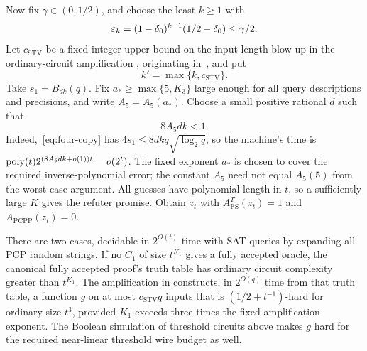 Now fix $\gamma\in(0,1/2)$, and choose the least $k\ge1$ with
\begin{equation}\label{eq:xor-k}
 \varepsilon_k=(1-\delta_0)^{k-1}(1/2-\delta_0)\le\gamma/2.
\end{equation}
Let $c_{\mathrm{STV}}$ be a fixed integer upper bound on the input-length blow-up in the
ordinary-circuit amplification \cite[Lemma 3.9]{CLW20}, originating
in~\cite{STV01}, and put
\begin{equation}\label{eq:kprime}
 k'=\max\{k,c_{\mathrm{STV}}\}.
\end{equation}
Take $s_1=B_{dk}(q)$. Fix
$a_*\ge\max\{5,K_3\}$ large enough for all query descriptions and
precisions, and write $A_5=A_5(a_*)$. Choose a small positive rational
$d$ such that
\begin{equation}\label{eq:avg-time-condition}
 8A_5dk<1.
\end{equation}
Indeed,~\eqref{eq:four-copy} has $4s_1\le8dkq\sqrt{\log_2q}$, so
the machine's time is
$\operatorname{poly}(t)2^{(8A_5dk+o(1))t}=o(2^t)$. The fixed exponent $a_*$ is
chosen to cover the required inverse-polynomial error; the constant
$A_5$ need not equal $A_5(5)$ from the worst-case argument.
All guesses have polynomial length in $t$, so a sufficiently large
$K$ gives the refuter promise. Obtain $z_t$ with
$A^T_{\mathrm{FS}}(z_t)=1$ and $A_{\mathrm{PCPP}}(z_t)=0$.

There are two cases, decidable in $2^{O(t)}$ time with SAT queries by
expanding all PCP random strings.
If no $C_1$ of size $t^{K_1}$ gives a fully accepted oracle, the
canonical fully accepted proof's truth table has ordinary circuit
complexity greater than $t^{K_1}$. The amplification in
\cite[Lemma 3.9]{CLW20} constructs, in $2^{O(q)}$ time from that
truth table, a function $g$ on at most $c_{\mathrm{STV}}q$ inputs
that is $(1/2+t^{-1})$-hard for ordinary size $t^3$, provided
$K_1$ exceeds three times the fixed amplification exponent. The
Boolean simulation of threshold circuits above makes $g$ hard for
the required near-linear threshold wire budget as well.

